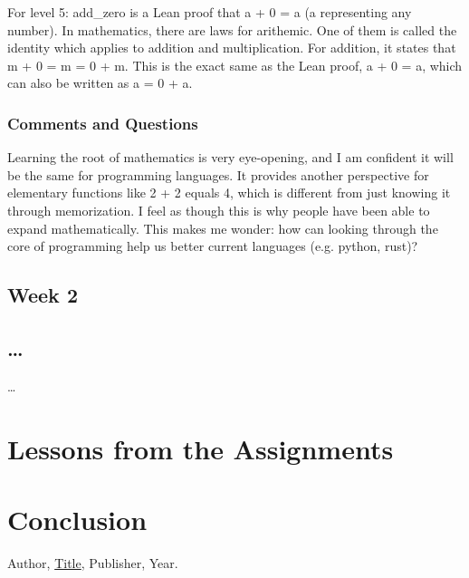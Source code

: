 \documentclass{article}
\theoremstyle{theorem}
\theoremstyle{definition}
\theoremstyle{remark}
\begin{document}
For level 5: 
add\_zero is a Lean proof that a + 0 = a (a representing any number). In mathematics, there are laws for arithemic. One of them 
is called the identity which applies to addition and multiplication. For addition, it states that m + 0 = m = 0 + m. This is the
exact same as the Lean proof, a + 0 = a, which can also be written as a = 0 + a.

%
%

\subsubsection*{Comments and Questions}
Learning the root of mathematics is very eye-opening, and I am confident it will be the same for programming languages. 
It provides another perspective for elementary functions like 2 + 2 equals 4, which is different from just knowing it through memorization. 
I feel as though this is why people have been able to expand mathematically. This makes me wonder: how can looking through the core of 
programming help us better current languages (e.g. python, rust)?

\subsection{Week 2}


\subsection{\ldots}

\ldots

\section{Lessons from the Assignments}


\section{Conclusion}\label{conclusion}


\begin{thebibliography}{99}
 Author, \href{https://en.wikipedia.org/wiki/LaTeX}{Title}, Publisher, Year.
\end{thebibliography}
\end{document}
